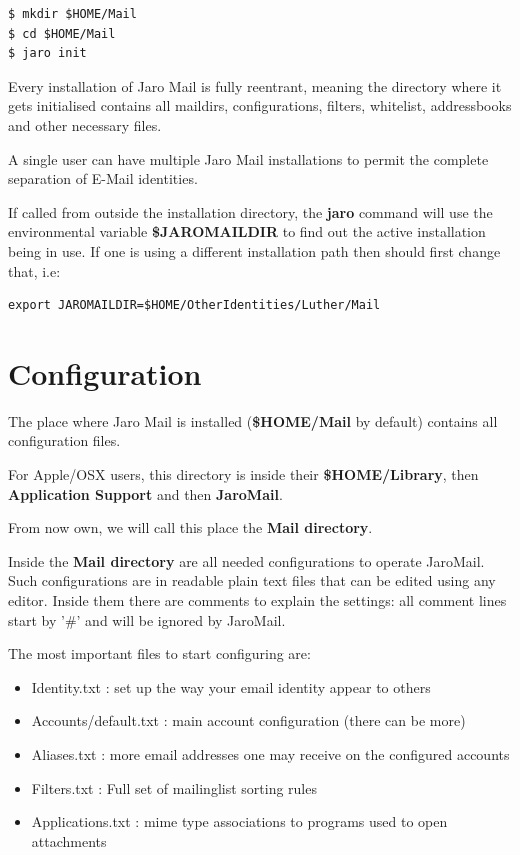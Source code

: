 \documentclass[a4,onecolumn,portrait]{article}
\begin{document}
\begin{verbatim}
$ mkdir $HOME/Mail
$ cd $HOME/Mail
$ jaro init
\end{verbatim}

Every installation of Jaro Mail is fully reentrant, meaning the directory where it gets initialised contains all maildirs, configurations, filters, whitelist, addressbooks and other necessary files.

A single user can have multiple Jaro Mail installations to permit the complete separation of E-Mail identities.

If called from outside the installation directory, the \textbf{jaro} command will use the environmental variable \textbf{\$JAROMAILDIR} to find out the active installation being in use. If one is using a different installation path then should first change that, i.e:

\begin{verbatim}
export JAROMAILDIR=$HOME/OtherIdentities/Luther/Mail
\end{verbatim}
\section{Configuration}
\label{sec-4}

The place where Jaro Mail is installed (\textbf{\$HOME/Mail} by default)
contains all configuration files.

For Apple/OSX users, this directory is inside their \textbf{\$HOME/Library}, then \textbf{Application Support} and then \textbf{JaroMail}.

From now own, we will call this place the \textbf{Mail directory}.

Inside the \textbf{Mail directory} are all needed configurations to operate JaroMail. Such configurations are in readable plain text files that can be edited using any editor. Inside them there are comments to explain the settings: all comment lines start by '\#' and will be ignored by JaroMail.

The most important files to start configuring are:

\begin{itemize}
\item Identity.txt : set up the way your email identity appear to others
\item Accounts/default.txt : main account configuration (there can be more)
\item Aliases.txt : more email addresses one may receive on the configured accounts
\item Filters.txt : Full set of mailinglist sorting rules
\item Applications.txt : mime type associations to programs used to open attachments
\end{itemize}
\end{document}
